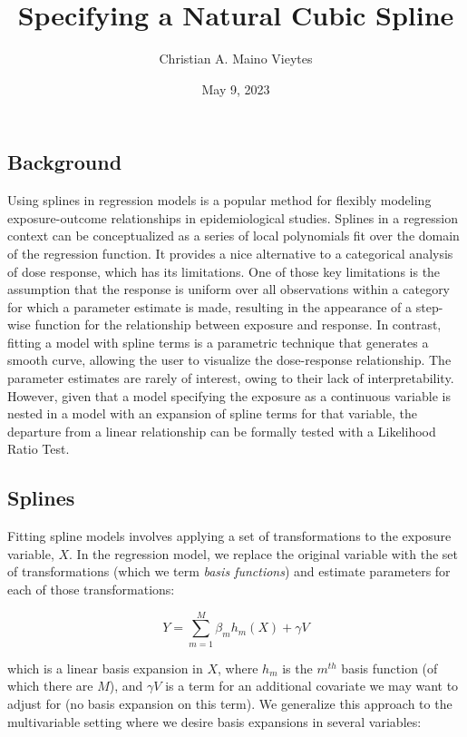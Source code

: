 \documentclass{article}
\title{Specifying a Natural Cubic Spline}
\author{Christian A. Maino Vieytes}
\date{May 9, 2023}
\begin{document}
\maketitle
{}

\subsection*{\textbf{Background}}
	Using splines in regression models is a popular method for flexibly modeling exposure-outcome relationships in epidemiological studies. \supercite{greenland_dose-response_1995, witte_nested_1997} Splines in a regression context can be conceptualized as a series of local polynomials fit over the domain of the regression function. It provides a nice alternative to a categorical analysis of dose response, which has its limitations. One of those key limitations is the assumption that the response is uniform over all observations within a category for which a parameter estimate is made, resulting in the appearance of a step-wise function for the relationship between exposure and response. \supercite{steenland_practical_2004} In contrast, fitting a model with spline terms is a parametric technique that generates a smooth curve, allowing the user to visualize the dose-response relationship. The parameter estimates are rarely of interest, owing to their lack of interpretability. \supercite{steenland_practical_2004} However, given that a model specifying the exposure as a continuous variable is nested in a model with an expansion of spline terms for that variable, the departure from a linear relationship can be formally tested with a Likelihood Ratio Test.\supercite{witte_nested_1997}


\subsection*{\textbf{Splines}}
Fitting spline models involves applying a set of transformations to the exposure variable, $X$. In the regression model, we replace the original variable with the set of transformations (which we term \textit{basis functions}) and estimate parameters for each of those transformations:

$$Y=\sum_{m=1}^{M}{\beta_mh_m(X)+\gamma V}$$

which is a linear basis expansion in $X$, where $h_m$ is the $m^{th}$ basis function (of which there are $M$), and $\gamma V$ is a term for an additional covariate we may want to adjust for (no basis expansion on this term).\supercite{hastie_elements_2009} We generalize this approach to the multivariable setting where we desire basis expansions in several variables:
\end{document}
